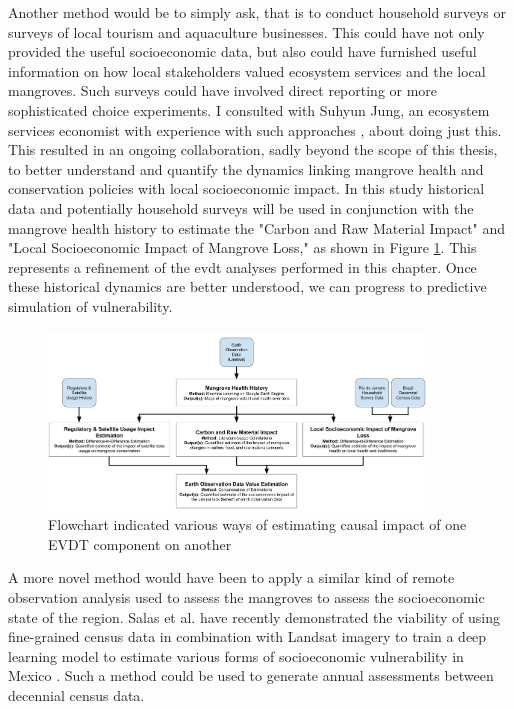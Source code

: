 Another method would be to simply ask, that is to conduct household surveys or surveys of local tourism and aquaculture businesses. This could have not only provided the useful socioeconomic data, but also could have furnished useful information on how local stakeholders valued ecosystem services and the local mangroves. Such surveys could have involved direct reporting or more sophisticated choice experiments. I consulted with Suhyun Jung, an ecosystem services economist with experience with such approaches \cite{jungBrazilNationalEnvironmental2017, jungPartnershipsPreventDeforestation2018, jungEvidenceWealthImprovingEffects2019a}, about doing just this. This resulted in an ongoing collaboration, sadly beyond the scope of this thesis, to better understand and quantify the dynamics linking mangrove health and conservation policies with local socioeconomic impact. In this study historical data and potentially household surveys will be used in conjunction with the mangrove health history to estimate the "Carbon and Raw Material Impact" and "Local Socioeconomic Impact of Mangrove Loss," as shown in Figure \ref{fig:method}. This represents a refinement of the \ac{evdt} analyses performed in this chapter. Once these historical dynamics are better understood, we can progress to predictive simulation of vulnerability.

\begin{figure}[!htb] 
\centering
\includegraphics[width=0.9\textwidth]{Figures/chap4/Method_Flowchart.png}
\caption[Potential EO Data Valuation Methodology]{Flowchart indicated various ways of estimating causal impact of one EVDT component on another}
\label{fig:method}
\end{figure}

A more novel method would have been to apply a similar kind of remote observation analysis used to assess the mangroves to assess the socioeconomic state of the region. Salas et al. have recently demonstrated the viability of using fine-grained census data in combination with Landsat imagery to train a deep learning model to estimate various forms of socioeconomic vulnerability in Mexico \cite{salasFineGrainedLargeScaleVulnerable2021}. Such a method could be used to generate annual assessments between decennial census data.

